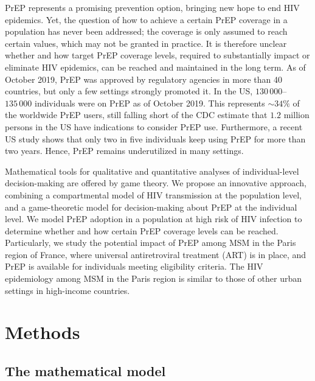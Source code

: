 \documentclass[preprint,review,12pt]{article}			%
\begin{document}
PrEP represents a promising prevention option, bringing new hope to end HIV epidemics. Yet, the question of how to achieve a certain PrEP coverage in a population has never been addressed; the coverage is only assumed to reach certain values, which may not be granted in practice. It is therefore unclear whether and how target PrEP coverage levels, required to substantially impact or eliminate HIV epidemics, can be reached and maintained in the long term. As of October 2019, PrEP was approved by regulatory agencies in more than 40 countries,\cite{PrEPwatch_2019} but only a few settings strongly promoted it.\cite{Cohen2018} In the US, $130\,000$--$135\,000$ individuals were on PrEP as of October 2019.\cite{PrEPwatch_2019} This represents $\sim34\%$ of the worldwide PrEP users,\cite{PrEPwatch_2019} still falling short of the CDC estimate that $1.2$ million persons in the US have indications to consider PrEP use.\cite{Laufer2015} Furthermore, a recent US study shows that only two in five individuals keep using PrEP for more than two years.\cite{Coy2019} Hence, PrEP remains underutilized in many settings.

Mathematical tools for qualitative and quantitative analyses of individual-level decision-making are offered by game theory.\cite{Verelst2016,Manfredi2017} We propose an innovative approach, combining a compartmental model of HIV transmission at the population level, and a game-theoretic model for decision-making about PrEP at the individual level. We model PrEP adoption in a population at high risk of HIV infection to determine whether and how certain PrEP coverage levels can be reached. Particularly, we study the potential impact of PrEP among MSM in the Paris region of France, where universal antiretroviral treatment (ART) is in place, and PrEP is available for individuals meeting eligibility criteria. The HIV epidemiology among MSM in the Paris region is similar to those of other urban settings in high-income countries.\cite{Marty2019}


\section{Methods} \label{sec:Methods}

\subsection{The mathematical model} \label{subsec:MathModel}
\end{document}
